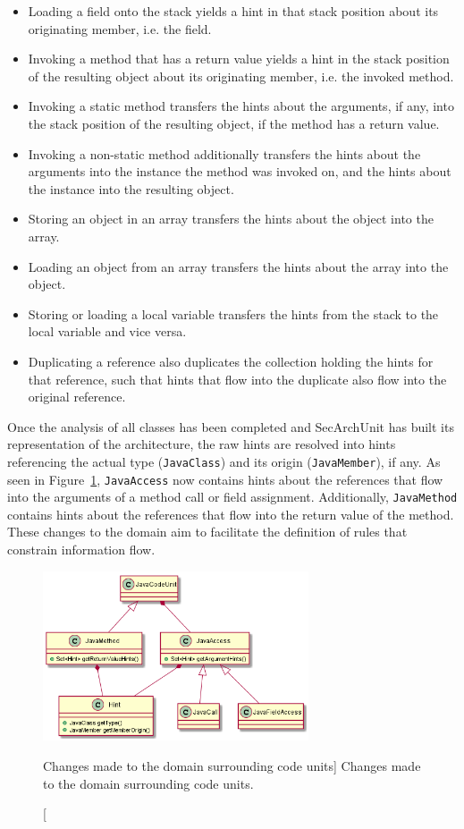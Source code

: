 \begin{itemize}
    \item Loading a field onto the stack yields a hint in that stack position about its originating member, i.e. the field.
    \item Invoking a method that has a return value yields a hint in the stack position of the resulting object about its originating member, i.e. the invoked method.
    \item Invoking a static method transfers the hints about the arguments, if any, into the stack position of the resulting object, if the method has a return value.
    \item Invoking a non-static method additionally transfers the hints about the arguments into the instance the method was invoked on, and the hints about the instance into the resulting object.
    \item Storing an object in an array transfers the hints about the object into the array.
    \item Loading an object from an array transfers the hints about the array into the object.
    \item Storing or loading a local variable transfers the hints from the stack to the local variable and vice versa.
    \item Duplicating a reference also duplicates the collection holding the hints for that reference, such that hints that flow into the duplicate also flow into the original reference.
\end{itemize}

Once the analysis of all classes has been completed and SecArchUnit has built its representation of the architecture, the raw hints are resolved into hints referencing the actual type (\texttt{JavaClass}) and its origin (\texttt{JavaMember}), if any. As seen in Figure~\ref{fig:domain_changes_1}, \texttt{JavaAccess} now contains hints about the references that flow into the arguments of a method call or field assignment. Additionally, \texttt{JavaMethod} contains hints about the references that flow into the return value of the method. These changes to the domain aim to facilitate the definition of rules that constrain information flow.

\begin{figure}
    \centering
    \includegraphics[width=0.7\textwidth]{figure/extension/DomainChanges1.png}
    \caption
        [Changes made to the domain surrounding code units]
        {Changes made to the domain surrounding code units.}
    \label{fig:domain_changes_1}
\end{figure}

